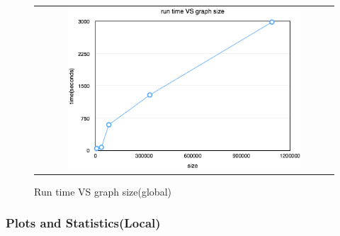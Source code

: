 \begin{figure}[h]
\begin{center}
\begin{tabular}{c}
     \includegraphics[width=0.8\textwidth]{FIG/t7_time.png}
\end{tabular}
\caption{Run time VS graph size(global)}
\label{t7:time}
\end{center}
\end{figure}

\subsubsection{Plots and Statistics(Local)}
